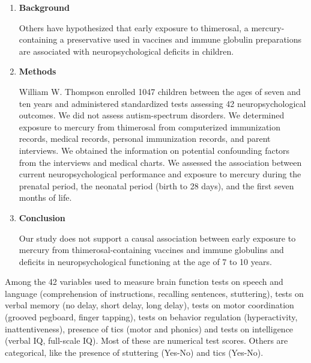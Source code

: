 \documentclass[11pt]{book}\usepackage[]{graphicx}\usepackage[]{color}
\begin{document}
\begin{enumerate}

\item \textbf{Background}

Others have hypothesized that early exposure to thimerosal, a mercury-containing a preservative used in vaccines and immune globulin preparations are associated with neuropsychological deficits in children.

\item \textbf{Methods}

William W. Thompson enrolled 1047 children between the ages of seven and ten years and administered standardized tests assessing 42 neuropsychological outcomes. We did not assess autism-spectrum disorders. We determined exposure to mercury from thimerosal from computerized immunization records, medical records, personal immunization records, and parent interviews.  We obtained the information on potential confounding factors from the interviews and medical charts. We assessed the association between current neuropsychological performance and exposure to mercury during the prenatal period, the neonatal period (birth to 28 days), and the first seven months of life.

\item \textbf{Conclusion}

Our study does not support a causal association between early exposure to mercury from thimerosal-containing vaccines and immune globulins and deficits in neuropsychological functioning at the age of 7 to 10 years.
\end{enumerate}

Among the 42 variables used to measure brain function tests on speech and language (comprehension of instructions, recalling sentences, stuttering), tests on verbal memory (no delay, short delay, long delay), tests on motor coordination (grooved pegboard, finger tapping), tests on behavior regulation (hyperactivity, inattentiveness), presence of tics (motor and phonics) and tests on intelligence (verbal IQ, full-scale IQ).  Most of these are numerical test scores.  Others are categorical, like the presence of stuttering (Yes-No) and tics (Yes-No).
\end{document}
